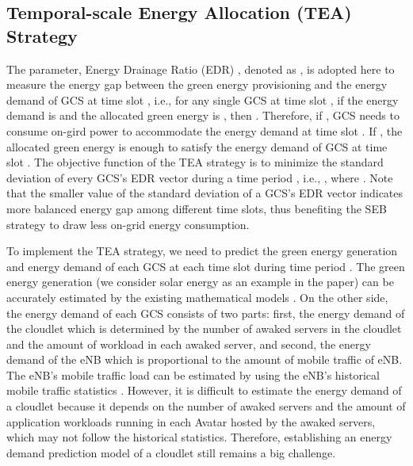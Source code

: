 \documentclass[journal,12pt,draftclsnofoot,onecolumn]{IEEEtran}
\begin{document}
\subsection{Temporal-scale Energy Allocation (TEA) Strategy}
The parameter, Energy Drainage Ratio (EDR) \cite{11}, denoted as , is adopted here to measure the energy gap between the green energy provisioning and the energy demand of GCS  at time slot , i.e., for any single GCS  at time slot , if the energy demand is  and the allocated green energy is , then . Therefore, if , GCS  needs to consume on-gird power to accommodate the energy demand at time slot . If , the allocated green energy is enough to satisfy the energy demand of GCS  at time slot . The objective function of the TEA strategy is to minimize the standard deviation of every GCS's EDR vector during a time period , i.e., ,  where . Note that the smaller value of the standard deviation of a GCS's EDR vector indicates more balanced energy gap among different time slots, thus benefiting the SEB strategy to draw less on-grid energy consumption. 

To implement the TEA strategy, we need to predict the green energy generation and energy demand of each GCS at each time slot during time period . The green energy generation (we consider solar energy as an example in the paper) can be accurately estimated by the existing mathematical models \cite{12}. On the other side, the energy demand of each GCS consists of two parts: first, the energy demand of the cloudlet which is determined by the number of awaked servers in the cloudlet and the amount of workload in each awaked server, and second, the energy demand of the eNB which is proportional to the amount of mobile traffic of eNB. The eNB's mobile traffic load can be estimated by using the eNB's historical mobile traffic statistics \cite{11}. However, it is difficult to estimate the energy demand of a cloudlet because it depends on the number of awaked servers and the amount of application workloads running in each Avatar hosted by the awaked servers, which may not follow the historical statistics. Therefore, establishing an energy demand prediction model of a cloudlet still remains a big challenge.
\end{document}
